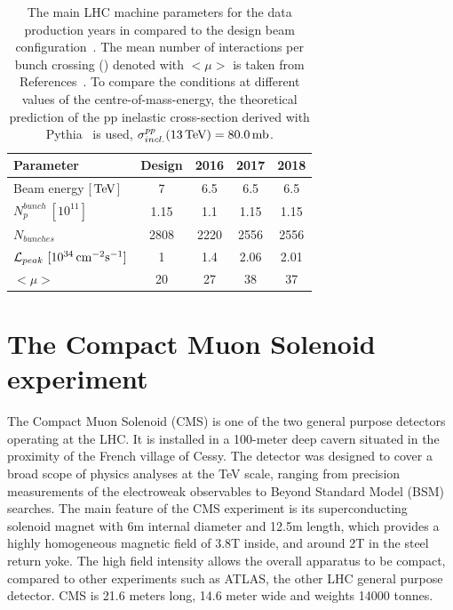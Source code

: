 \begin{table}
  \caption{The main LHC machine parameters for the data production years in \RunII{} compared to the design beam configuration~\cite{CERN-2004-003}.
  The mean number of interactions per bunch crossing (\pileup) denoted with $<\mu>$ is taken from References~\cite{CMS-LUM-17-003, CMS-LUM-17-004, CMS-LUM-18-002}.
  To compare the \pileup{} conditions at different values of the centre-of-mass-energy, the theoretical prediction of the pp inelastic cross-section derived with
  Pythia~\cite{Sjostrand:2015} is used, \ie $\sigma^{pp}_{incl.}(13\,\text{Te\hspace{-.08em}V}) = 80.0\text{\,\text{mb}}$.}
  \label{tab:LHCparamsRun2}
  \centering
  \begin{tabular}{l c c c c}
    \toprule
    Parameter                & Design & 2016 & 2017 & 2018\\
    \midrule
    Beam energy [$\,\text{Te\hspace{-.08em}V}$]     &     7  &  6.5 &  6.5 &  6.5\\
    $N_p^{bunch}\ [10^{11}]$ &  1.15  & 1.1  & 1.15 & 1.15\\
    $N_{bunches}$            &  2808  & 2220 & 2556 & 2556\\
    $\mathcal{L}_{peak}\ [10^{34}\cm^{-2}\text{s}^{-1}]$ & 1 & 1.4 & 2.06 & 2.01\\
    $<\mu>$                  &    20  &   27 &   38 &   37\\
    \bottomrule
  \end{tabular}
\end{table}

\section{The Compact Muon Solenoid experiment}
The Compact Muon Solenoid (CMS) is one of the two general purpose detectors operating at the LHC.
It is installed in a 100-meter deep cavern situated in the proximity of the French village of Cessy.
The detector was designed to cover a broad scope of physics analyses at the TeV scale, ranging from precision measurements of the electroweak observables to Beyond Standard Model (BSM) searches.
The main feature of the CMS experiment is its superconducting solenoid magnet with 6\usep m internal diameter and 12.5\usep m length, which provides a highly homogeneous magnetic field of 3.8\usep T inside, and around 2\usep T in the steel return yoke.
The high field intensity allows the overall apparatus to be compact, compared to other experiments such as ATLAS, the other LHC general purpose detector.
CMS is 21.6 meters long, 14.6 meter wide and weights 14000 tonnes.

